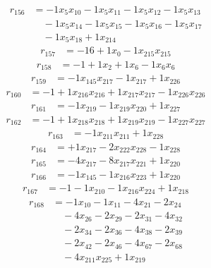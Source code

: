 \[\begin{aligned}
r_{156} &= - 1 x_{5} x_{10} - 1 x_{5} x_{11} - 1 x_{5} x_{12} - 1 x_{5} x_{13} \\
 &\quad - 1 x_{5} x_{14} - 1 x_{5} x_{15} - 1 x_{5} x_{16} - 1 x_{5} x_{17} \\
 &\quad - 1 x_{5} x_{18} + 1 x_{214}
\end{aligned}\]
\[\begin{aligned}
r_{157} &= - 16 + 1 x_{0} - 1 x_{215} x_{215}
\end{aligned}\]
\[\begin{aligned}
r_{158} &= - 1 + 1 x_{2} + 1 x_{6} - 1 x_{6} x_{6}
\end{aligned}\]
\[\begin{aligned}
r_{159} &= - 1 x_{145} x_{217} - 1 x_{217} + 1 x_{226}
\end{aligned}\]
\[\begin{aligned}
r_{160} &= - 1 + 1 x_{216} x_{216} + 1 x_{217} x_{217} - 1 x_{226} x_{226}
\end{aligned}\]
\[\begin{aligned}
r_{161} &= - 1 x_{219} - 1 x_{219} x_{220} + 1 x_{227}
\end{aligned}\]
\[\begin{aligned}
r_{162} &= - 1 + 1 x_{218} x_{218} + 1 x_{219} x_{219} - 1 x_{227} x_{227}
\end{aligned}\]
\[\begin{aligned}
r_{163} &= - 1 x_{211} x_{211} + 1 x_{228}
\end{aligned}\]
\[\begin{aligned}
r_{164} &= + 1 x_{217} - 2 x_{222} x_{228} - 1 x_{228}
\end{aligned}\]
\[\begin{aligned}
r_{165} &= - 4 x_{217} - 8 x_{217} x_{221} + 1 x_{220}
\end{aligned}\]
\[\begin{aligned}
r_{166} &= - 1 x_{145} - 1 x_{216} x_{223} + 1 x_{220}
\end{aligned}\]
\[\begin{aligned}
r_{167} &= - 1 - 1 x_{210} - 1 x_{216} x_{224} + 1 x_{218}
\end{aligned}\]
\[\begin{aligned}
r_{168} &= - 1 x_{10} - 1 x_{11} - 4 x_{21} - 2 x_{24} \\
 &\quad - 4 x_{26} - 2 x_{29} - 2 x_{31} - 4 x_{32} \\
 &\quad - 2 x_{34} - 2 x_{36} - 4 x_{38} - 2 x_{39} \\
 &\quad - 2 x_{42} - 2 x_{46} - 4 x_{67} - 2 x_{68} \\
 &\quad - 4 x_{211} x_{225} + 1 x_{219}
\end{aligned}\]
